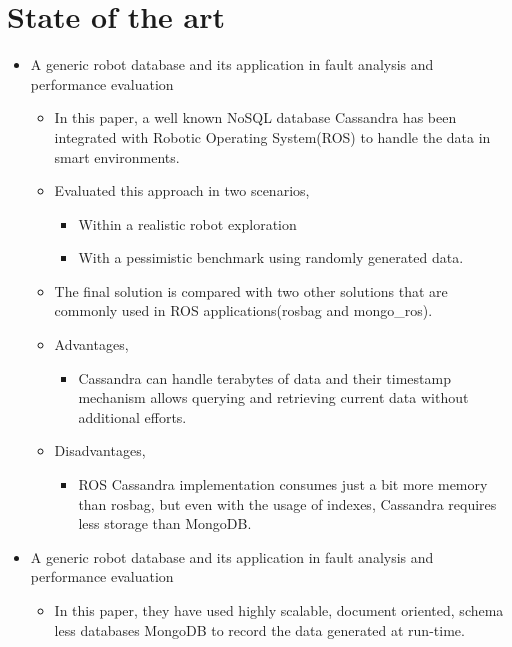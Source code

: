\documentclass[12pt]{article}
\begin{document}
\section{State of the art}
\begin{itemize}
\item A generic robot database and its application in fault analysis and performance evaluation \cite{reference1}
\begin{itemize}
\item In this paper, a well known NoSQL database Cassandra has been integrated with Robotic Operating System(ROS) to handle the data in smart environments.

\item Evaluated this approach in two scenarios,

\begin{itemize}
\item Within a realistic robot exploration
\item With a pessimistic benchmark using randomly generated data.
\end{itemize}

\item The final solution is compared with two other solutions that are commonly used in ROS applications(rosbag and mongo\_ros).

\item Advantages,
\begin{itemize}
\item Cassandra can handle terabytes of data and their timestamp mechanism allows querying and retrieving current data without additional efforts.
\end{itemize}

\item Disadvantages,
\begin{itemize}
\item ROS Cassandra implementation consumes just a bit more memory than rosbag, but even with the usage of indexes, Cassandra requires less storage than MongoDB.
\end{itemize}
\end{itemize}

\item A generic robot database and its application in fault analysis and performance evaluation\cite{reference2}
\begin{itemize}
\item In this paper, they have used highly scalable, document oriented, schema less databases MongoDB to record the data generated at run-time.


\end{itemize}
\end{itemize}
\end{document}
